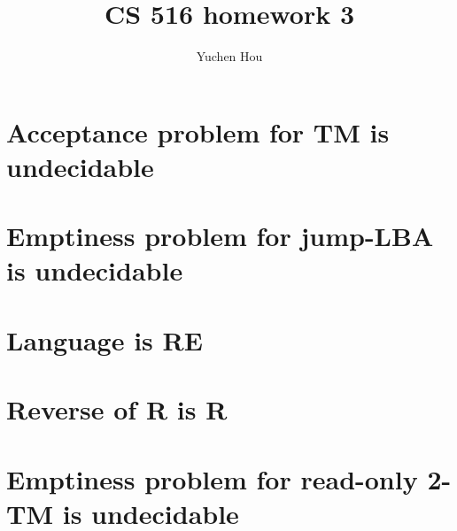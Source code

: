 \documentclass{article}
\begin{document}
\lstset{language=python, tabsize=4}
\title{CS 516 homework 3}
\author{Yuchen Hou}
\maketitle

\section{Acceptance problem for TM is undecidable}

\section{Emptiness problem for jump-LBA is undecidable}

\section{Language is RE}

\section{Reverse of R is R}

\section{Emptiness problem for read-only 2-TM is undecidable}
\end{document}
